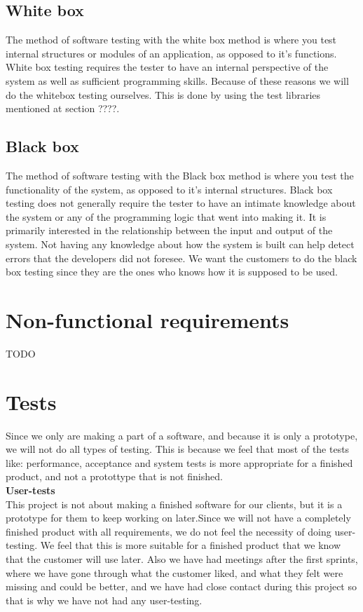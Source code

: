 \documentclass{report}
\begin{document}
\subsection{White box} \label{subse:white_box}
The method of software testing with the white box method is where you test internal structures or modules of an application, as opposed to it's functions. White box testing requires the tester to have an internal perspective of the system as well as sufficient programming skills. Because of these reasons we will do the whitebox testing ourselves. This is done by using the test libraries mentioned at section ????. %

\subsection{Black box} \label{subsec:black_box}
The method of software testing with the Black box method is where you test the functionality of the system, as opposed to it's internal structures. Black box testing does not generally require the tester to have an intimate knowledge about the system or any of the programming logic that went into making it. It is primarily interested in the relationship between the input and output of the system. Not having any knowledge about how the system is built can help detect errors that the developers did not foresee. We want the customers to do the black box testing since they are the ones who knows how it is supposed to be used.

\section{Non-functional requirements} \label{sec:non_func_req}
TODO

\section{Tests} \label{sec:tests}
Since we only are making a part of a software, and because it is only a prototype, we will not do all types of testing. This is because we feel that most of the tests like: performance, acceptance and system tests is more appropriate for a finished product, and not a protottype that is not finished. \\
\textbf{User-tests} \\
This project is not about making a finished software for our clients, but it is a prototype for them to keep working on later.Since we will not have a completely finished product with all requirements, we do not feel the necessity of doing user-testing. We feel that this is more suitable for a finished product that we know that the customer will use later. Also we have had meetings after the first sprints, where we have gone through what the customer liked, and what they felt were missing and could be better, and we have had close contact during this project so that is why we have not had any user-testing.
\end{document}
